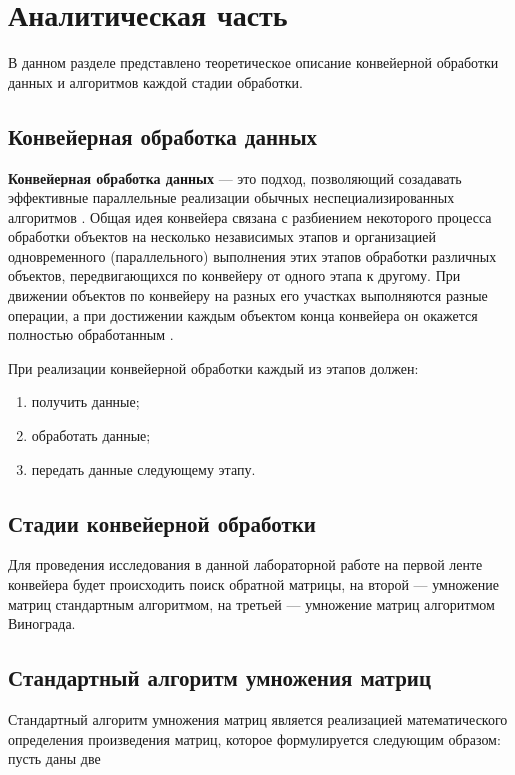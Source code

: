\chapter{Аналитическая часть}

В данном разделе представлено теоретическое описание конвейерной обработки
данных и алгоритмов каждой стадии обработки.

\section{Конвейерная обработка данных}

\textbf{Конвейерная обработка данных} --- это подход, позволяющий созадавать
эффективные параллельные реализации обычных неспециализированных алгоритмов
\cite{Pogorelov}. Общая идея конвейера связана с разбиением некоторого
процесса обработки объектов на несколько независимых этапов и организацией
одновременного (параллельного) выполнения этих этапов обработки различных
объектов, передвигающихся по конвейеру от одного этапа к другому. При движении
объектов по конвейеру на разных его участках выполняются разные операции, а при
достижении каждым объектом конца конвейера он окажется полностью обработанным
\cite{Bogoslovskiy}.

При реализации конвейерной обработки каждый из этапов должен:

\begin{enumerate}
    \item получить данные;
    \item обработать данные;
    \item передать данные следующему этапу.
\end{enumerate}

\section{Стадии конвейерной обработки}

Для проведения исследования в данной лабораторной работе на первой ленте 
конвейера будет происходить поиск обратной матрицы, на второй --- умножение матриц 
стандартным алгоритмом, на третьей --- умножение матриц алгоритмом Винограда.

\section{Стандартный алгоритм умножения матриц}

Стандартный алгоритм умножения матриц является реализацией математического определения
произведения матриц, которое формулируется следующим образом: пусть даны две 

